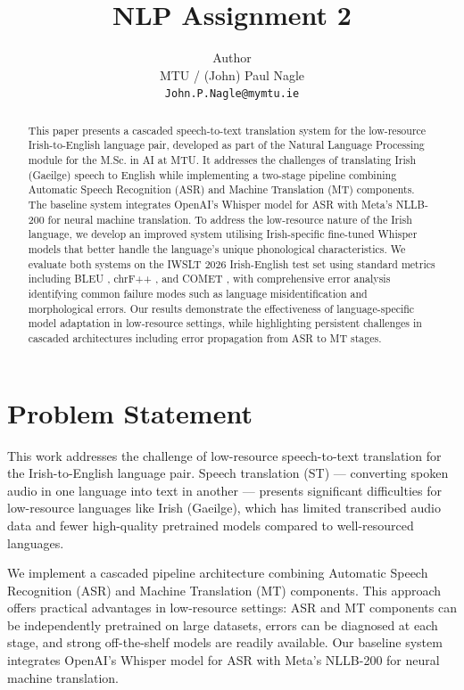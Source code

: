 \documentclass[11pt]{article}
\title{NLP Assignment 2}
\author{ Author \\
  MTU / (John) Paul Nagle \\
  \texttt{John.P.Nagle@mymtu.ie} \\}
\begin{document}
\maketitle
\begin{abstract}
This paper presents a cascaded speech-to-text translation system for the low-resource Irish-to-English language pair, developed as part of the Natural Language Processing 
module for the M.Sc. in AI at MTU. It addresses the challenges of translating Irish (Gaeilge) speech to English while implementing a two-stage pipeline combining Automatic Speech 
Recognition (ASR) and Machine Translation (MT) components. The baseline system integrates OpenAI's Whisper model \citep{radford2023whisper} for ASR with Meta's NLLB-200 
\citep{nllb2022} for neural machine translation. To address the low-resource nature of the Irish language, we develop an improved system utilising Irish-specific fine-tuned Whisper 
models that better handle the language's unique phonological characteristics. We evaluate both systems on the IWSLT 2026 Irish-English test set using standard metrics
including BLEU \citep{papineni2002bleu}, chrF++ \citep{popovic2015chrf}, and COMET \citep{rei2020comet}, with comprehensive error analysis identifying common failure modes such as language misidentification
and morphological errors. Our results demonstrate the effectiveness of language-specific model adaptation in low-resource settings, while highlighting persistent challenges
in cascaded architectures including error propagation from ASR to MT stages.
\end{abstract}

\section{Problem Statement}

This work addresses the challenge of low-resource speech-to-text translation for the Irish-to-English language pair. Speech translation (ST) — converting spoken audio in one 
language into text in another — presents significant difficulties for low-resource languages like Irish (Gaeilge), which has limited transcribed audio data and fewer high-quality 
pretrained models compared to well-resourced languages.

We implement a cascaded pipeline architecture combining Automatic Speech Recognition (ASR) and Machine Translation (MT) components. This approach offers practical advantages 
in low-resource settings: ASR and MT components can be independently pretrained on large datasets, errors can be diagnosed at each stage, and strong off-the-shelf models are 
readily available. Our baseline system integrates OpenAI's Whisper model for ASR with Meta's NLLB-200 for neural machine translation.
\end{document}
